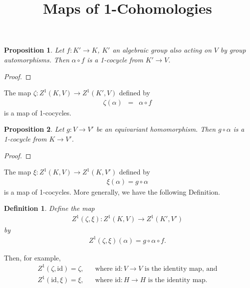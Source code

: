 \documentclass[12pt, a4paper]{amsart}
\newtheorem{prop}{Proposition}
\newtheorem{defn}{Definition}
\begin{document}
\title{Maps of 1-Cohomologies}
\maketitle
\begin{prop}
	Let $f:K'\rightarrow K$, $K'$ an algebraic group also acting on $V$ by group automorphisms. Then $\alpha \circ f$ is a 1-cocycle from $K' \rightarrow V$.
\end{prop}
\begin{proof}
\end{proof}

The map $\zeta:Z^1(K, V) \rightarrow Z^1(K', V)$ defined by
\begin{eqnarray*}
	\zeta(\alpha) &=& \alpha \circ f
\end{eqnarray*}
is a map of 1-cocycles.

\begin{prop}
	Let $g:V \rightarrow V'$ be an equivariant homomorphism. Then $g \circ \alpha$ is a 1-cocycle from $K \rightarrow V'$.
\end{prop}
\begin{proof}
\end{proof}

The map $\xi:Z^1(K, V) \rightarrow Z^1(K, V')$ defined by
\begin{eqnarray*}
	\xi(\alpha) = g \circ \alpha
\end{eqnarray*}
is a map of 1-cocycles. More generally, we have the following Definition.

\begin{defn}
	Define the map
	\begin{eqnarray*}
		Z^1(\zeta, \xi):Z^1(K, V) \rightarrow Z^1(K', V')
	\end{eqnarray*}
	by
	\begin{eqnarray*}
		Z^1(\zeta, \xi)(\alpha) = g \circ \alpha \circ f.
	\end{eqnarray*}
\end{defn}

Then, for example,
\begin{eqnarray*}
	Z^1(\zeta, \mathrm{id}) = \zeta, && \textrm{where }\mathrm{id}:V\rightarrow V \textrm{ is the identity map, and} \\
	Z^1(\mathrm{id}, \xi) = \xi,     && \textrm{where }\mathrm{id}:H\rightarrow H \textrm{ is the identity map}.
\end{eqnarray*}
\end{document}

